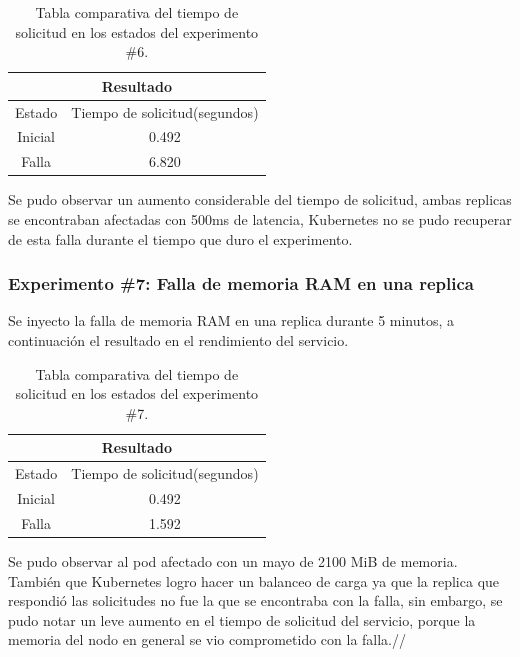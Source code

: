 \begin{table}[ht!]
\begin{center}
\begin{tabular}{ |c|c| } 
 \hline
 \multicolumn{2}{|c|}{Resultado} \\
 \hline
 \hline
 Estado & Tiempo de solicitud(segundos)\\
 \hline
 Inicial & 0.492\\
 Falla & 6.820\\
 \hline
\end{tabular}
\end{center}
\caption{Tabla comparativa del tiempo de solicitud en los estados del experimento \#6.}
\label{tab:tabla50}
\end{table}

\par Se pudo observar un aumento considerable del tiempo de solicitud, ambas replicas se encontraban afectadas con 500ms de latencia, Kubernetes no se pudo recuperar de esta falla durante el tiempo que duro el experimento.\\

\subsubsection{Experimento \#7: Falla de memoria RAM en una replica}

\par Se inyecto la falla de memoria RAM en una replica durante 5 minutos, a continuación el resultado en el rendimiento del servicio.\\

\begin{table}[ht!]
\begin{center}
\begin{tabular}{ |c|c| } 
 \hline
 \multicolumn{2}{|c|}{Resultado} \\
 \hline
 \hline
 Estado & Tiempo de solicitud(segundos)\\
 \hline
 Inicial & 0.492\\
 Falla & 1.592\\
 \hline
\end{tabular}
\end{center}
\caption{Tabla comparativa del tiempo de solicitud en los estados del experimento \#7.}
\label{tab:tabla51}
\end{table}

\par Se pudo observar al pod afectado con un mayo de 2100 MiB de memoria. También que Kubernetes logro hacer un balanceo de carga ya que la replica que respondió las solicitudes no fue la que se encontraba con la falla, sin embargo, se pudo notar un leve aumento en el tiempo de solicitud del servicio, porque la memoria del nodo en general se vio comprometido con la falla.//


